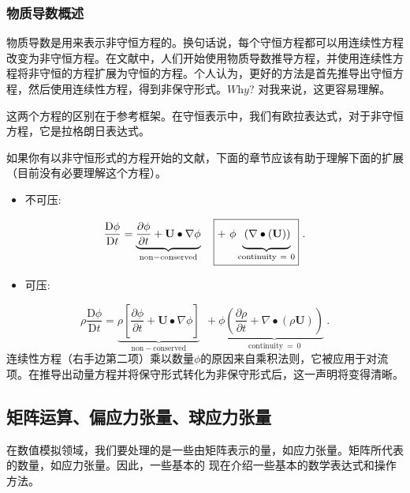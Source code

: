 \documentclass[MathematicsNumericsDerivationsAndOpenFOAM.tex]{subfiles}
\begin{document}
\subsubsection{物质导数概述}
%
%

	物质导数是用来表示非守恒方程的。换句话说，每个守恒方程都可以用连续性方程改变为非守恒方程。在文献中，人们开始使用物质导数推导方程，并使用连续性方程将非守恒的方程扩展为守恒的方程。个人认为，更好的方法是首先推导出守恒方程，然后使用连续性方程，得到非保守形式。$\textit{Why}$? 对我来说，这更容易理解。


	这两个方程的区别在于参考框架。在守恒表示中，我们有欧拉表达式，对于非守恒方程，它是拉格朗日表达式。


	如果你有以非守恒形式的方程开始的文献，下面的章节应该有助于理解下面的扩展（目前没有必要理解这个方程）。
%
%
\begin{itemize}
    \item 不可压:
\end{itemize}
%
%
\begin{equation}
    \frac{\mathrm{D}\phi}{\mathrm{D}t}
=
    \underbrace
    {
        \frac{\partial \phi}{\partial t}
      + \textbf{U}\bullet \nabla \phi
    }_{\mathrm{non-conserved}}
 ~~~
     \boxed
     { + ~
        \phi
        \underbrace
        {
            \vphantom{\frac{1}{2}}\left( \nabla \bullet (\textbf{U})\right)
        }_{\mathrm{continuity~=~0}}
     } ~.
\end{equation}
%
%
\begin{itemize}
    \item 可压:
\end{itemize}
%
%
\begin{equation}
   \rho \frac{\mathrm{D}\phi}{\mathrm{D}t}
=
    \underbrace
    {
        \rho\left[\frac{\partial \phi}{\partial t}
      + \textbf{U}\bullet \nabla \phi\right]
    }_{\mathrm{non-conserved}}
 ~~~
    \boxed
    { + ~
        \phi
        \underbrace
        {
            \left( \frac{\partial \rho}{\partial t}
          + \nabla \bullet (\rho \textbf{U})\right)
        }_{\mathrm{continuity~=~0}}
    } ~.
\end{equation}
%
%
	连续性方程（右手边第二项）乘以数量$\phi$的原因来自乘积法则，它被应用于对流项。在推导出动量方程并将保守形式转化为非保守形式后，这一声明将变得清晰。
%
%
%
%
\subsection{矩阵运算、偏应力张量、球应力张量}
%
%
	在数值模拟领域，我们要处理的是一些由矩阵表示的量，如应力张量。矩阵所代表的数量，如应力张量。因此，一些基本的 现在介绍一些基本的数学表达式和操作方法。
\end{document}
